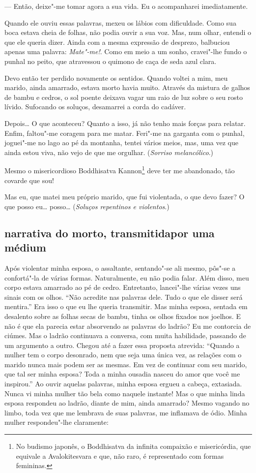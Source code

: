 --- Então, deixe"-me tomar agora a sua vida. Eu o acompanharei
imediatamente.

Quando ele ouviu essas palavras, mexeu os lábios com dificuldade. Como
sua boca estava cheia de folhas, não podia ouvir a sua voz. Mas, num
olhar, entendi o que ele queria dizer. Ainda com a mesma expressão de
desprezo, balbuciou apenas uma palavra: \textit{Mate"-me!}. Como em meio a um
sonho, cravei"-lhe fundo o punhal no peito, que atravessou o quimono de
caça de seda azul clara.

Devo então ter perdido novamente os sentidos. Quando voltei a mim, meu
marido, ainda amarrado, estava morto havia muito. Através da mistura de
galhos de bambu e cedros, o sol poente deixava vagar um raio de luz
sobre o seu rosto lívido. Sufocando os soluços, desamarrei a corda do cadáver.

Depois\ldots{} O que aconteceu? Quanto a isso, já não tenho mais forças para
relatar. Enfim, faltou"-me coragem para me matar. Feri"-me na garganta
com o punhal, joguei"-me no lago ao pé da montanha, tentei vários meios,
mas, uma vez que ainda estou viva, não vejo de que me orgulhar.
(\textit{Sorriso melancólico}.)

Mesmo o misericordioso Boddhisatva Kannon\footnote{ No budismo japonês,
o Boddhisatva da infinita compaixão e misericórdia, que equivale a
Avalokitesvara e que, não raro, é representado com formas femininas.}
deve ter me abandonado, tão covarde que sou!

Mas eu, que matei meu próprio marido, que fui violentada, o que devo
fazer? O que posso eu\ldots{} posso\ldots{} (\textit{Soluços repentinos e violentos}.)

\subsection*{narrativa do morto, transmitida\break por uma médium}

Após violentar minha esposa, o assaltante, sentando"-se ali mesmo,
pôs"-se a confortá"-la de várias formas. Naturalmente, eu não podia
falar. Além disso, meu corpo estava amarrado ao pé de cedro.
Entretanto, lancei"-lhe várias vezes uns sinais com os olhos. ``Não
acredite nas palavras dele. Tudo o que ele disser será mentira.'' Era
isso o que eu lhe queria transmitir. Mas minha esposa, sentada em
desalento sobre as folhas secas de bambu, tinha os olhos fixados nos
joelhos. E não é que ela parecia estar absorvendo as palavras do
ladrão? Eu me contorcia de ciúmes. Mas o ladrão continuava a conversa,
com muita habilidade, passando de um argumento a outro. Chegou até a
fazer essa proposta atrevida: ``Quando a mulher tem o corpo desonrado,
nem que seja uma única vez, as relações com o marido nunca mais podem
ser as mesmas. Em vez de continuar com seu marido, que tal ser minha
esposa? Toda a minha ousadia nasceu do amor que você me inspirou.'' Ao
ouvir aquelas palavras, minha esposa ergueu a cabeça, extasiada. Nunca
vi minha mulher tão bela como naquele instante! Mas o que minha linda
esposa respondeu ao ladrão, diante de mim, ainda amarrado? Mesmo
vagando no limbo, toda vez que me lembrava de suas palavras, me
inflamava de ódio. Minha mulher respondeu"-lhe claramente:

